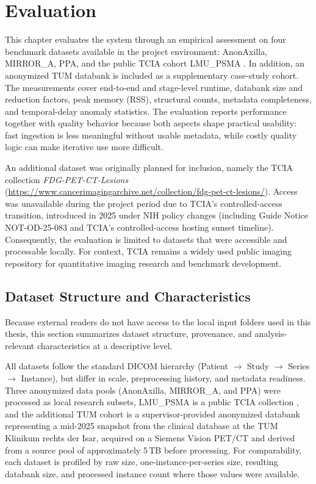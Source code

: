 \chapter{Evaluation}
This chapter evaluates the system through an empirical assessment on four benchmark datasets available in the project environment: AnonAxilla, MIRROR\_A, PPA, and the public TCIA cohort LMU\_PSMA \cite{lmu_psma_tcia_2026}. In addition, an anonymized TUM databank is included as a supplementary case-study cohort. The measurements cover end-to-end and stage-level runtime, databank size and reduction factors, peak memory (RSS), structural counts, metadata completeness, and temporal-delay anomaly statistics. The evaluation reports performance together with quality behavior because both aspects shape practical usability: fast ingestion is less meaningful without usable metadata, while costly quality logic can make iterative use more difficult.

An additional dataset was originally planned for inclusion, namely the TCIA collection \emph{FDG-PET-CT-Lesions} (\url{https://www.cancerimagingarchive.net/collection/fdg-pet-ct-lesions/}). Access was unavailable during the project period due to TCIA's controlled-access transition, introduced in 2025 under NIH policy changes (including Guide Notice NOT-OD-25-083 and TCIA's controlled-access hosting sunset timeline). Consequently, the evaluation is limited to datasets that were accessible and processable locally. For context, TCIA remains a widely used public imaging repository for quantitative imaging research and benchmark development.

\section{Dataset Structure and Characteristics}
Because external readers do not have access to the local input folders used in this thesis, this section summarizes dataset structure, provenance, and analysis-relevant characteristics at a descriptive level.

All datasets follow the standard DICOM hierarchy (Patient $\rightarrow$ Study $\rightarrow$ Series $\rightarrow$ Instance), but differ in scale, preprocessing history, and metadata readiness. Three anonymized data pools (AnonAxilla, MIRROR\_A, and PPA) were processed as local research subsets, LMU\_PSMA is a public TCIA collection \cite{lmu_psma_tcia_2026}, and the additional TUM cohort is a supervisor-provided anonymized databank representing a mid-2025 snapshot from the clinical database at the TUM Klinikum rechts der Isar, acquired on a Siemens Vision PET/CT and derived from a source pool of approximately 5\,TB before processing. For comparability, each dataset is profiled by raw size, one-instance-per-series size, resulting databank size, and processed instance count where those values were available.


